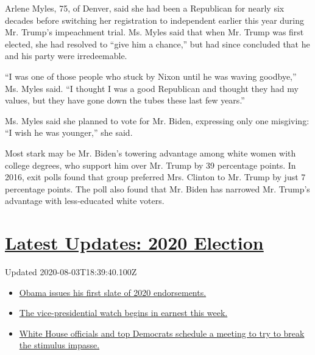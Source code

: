 Arlene Myles, 75, of Denver, said she had been a Republican for nearly
six decades before switching her registration to independent earlier
this year during Mr. Trump's impeachment trial. Ms. Myles said that when
Mr. Trump was first elected, she had resolved to ``give him a chance,''
but had since concluded that he and his party were irredeemable.

``I was one of those people who stuck by Nixon until he was waving
goodbye,'' Ms. Myles said. ``I thought I was a good Republican and
thought they had my values, but they have gone down the tubes these last
few years.''

Ms. Myles said she planned to vote for Mr. Biden, expressing only one
misgiving: ``I wish he was younger,'' she said.

Most stark may be Mr. Biden's towering advantage among white women with
college degrees, who support him over Mr. Trump by 39 percentage points.
In 2016, exit polls found that group preferred Mrs. Clinton to Mr. Trump
by just 7 percentage points. The poll also found that Mr. Biden has
narrowed Mr. Trump's advantage with less-educated white voters.

\hypertarget{latest-updates-2020-election}{%
\section{\texorpdfstring{\href{https://www.nytimes.com/2020/08/03/us/elections/biden-vs-trump.html?action=click\&pgtype=Article\&state=default\&region=MAIN_CONTENT_1\&context=storylines_live_updates}{Latest
Updates: 2020
Election}}{Latest Updates: 2020 Election}}\label{latest-updates-2020-election}}

Updated 2020-08-03T18:39:40.100Z

\begin{itemize}
\tightlist
\item
  \href{https://www.nytimes.com/2020/08/03/us/elections/biden-vs-trump.html?action=click\&pgtype=Article\&state=default\&region=MAIN_CONTENT_1\&context=storylines_live_updates\#link-3de249e6}{Obama
  issues his first slate of 2020 endorsements.}
\item
  \href{https://www.nytimes.com/2020/08/03/us/elections/biden-vs-trump.html?action=click\&pgtype=Article\&state=default\&region=MAIN_CONTENT_1\&context=storylines_live_updates\#link-2a2c5488}{The
  vice-presidential watch begins in earnest this week.}
\item
  \href{https://www.nytimes.com/2020/08/03/us/elections/biden-vs-trump.html?action=click\&pgtype=Article\&state=default\&region=MAIN_CONTENT_1\&context=storylines_live_updates\#link-7fba2990}{White
  House officials and top Democrats schedule a meeting to try to break
  the stimulus impasse.}
\end{itemize}

